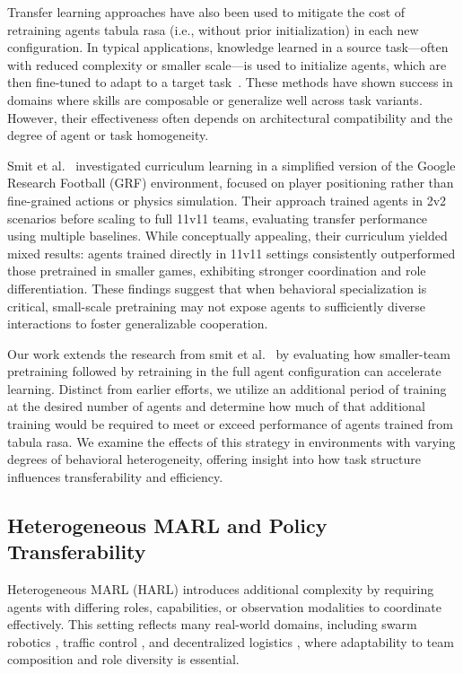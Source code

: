 \documentclass{article}
\begin{document}
Transfer learning approaches have also been used to mitigate the cost of retraining agents 
tabula rasa (i.e., without prior initialization) in each new configuration. 
In typical applications, knowledge learned in a source task—often with reduced 
complexity or smaller scale—is used to initialize agents, 
which are then fine-tuned to adapt to a target task~\cite{cui2022}. 
These methods have shown success in domains where skills are composable 
or generalize well across task variants. However, their effectiveness often 
depends on architectural compatibility and the degree of agent or task homogeneity.

Smit et al.~\cite{smit2023} investigated curriculum learning in a simplified version of the 
Google Research Football (GRF) environment, focused on player positioning rather than 
fine-grained actions or physics simulation. Their approach trained agents in 2v2 scenarios 
before scaling to full 11v11 teams, evaluating transfer performance using multiple baselines. 
While conceptually appealing, their curriculum yielded mixed results: agents trained directly 
in 11v11 settings consistently outperformed those pretrained in smaller games, exhibiting 
stronger coordination and role differentiation. These findings suggest that when behavioral 
specialization is critical, small-scale pretraining may not expose agents to sufficiently 
diverse interactions to foster generalizable cooperation.

Our work extends the research from smit et al.~\cite{smit2023}
by evaluating how smaller-team pretraining followed 
by retraining in the full agent configuration can accelerate learning. 
Distinct from earlier efforts, we utilize an additional period of training at 
the desired number of agents and determine how much of that additional training would 
be required to meet or exceed performance of agents trained from tabula rasa.
We examine the effects of this strategy in environments with varying degrees of 
behavioral heterogeneity, offering insight into how task structure influences 
transferability and efficiency.

\subsection{Heterogeneous MARL and Policy Transferability}

Heterogeneous MARL (HARL) introduces additional complexity by requiring agents with differing
roles, capabilities, or observation modalities to coordinate effectively. This setting reflects
many real-world domains, including swarm robotics \cite{hoang2023}, traffic control \cite{calvo2018},
and decentralized logistics \cite{rizk2019}, where adaptability to team composition and role diversity
is essential.
\end{document}
